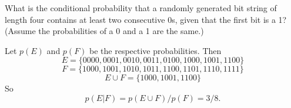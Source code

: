 \documentclass[../main.tex]{subfiles}
\begin{document}
What is the conditional probability that a randomly generated bit string of length four contains at least two consecutive 0s, given that the first bit is a 1?
(Assume the probabilities of a 0 and a 1 are the same.)

\solution
Let $p(E)$ and $p(F)$ be the respective probabilities.
Then
\[
	E = \{0000, 0001, 0010, 0011, 0100, 1000, 1001, 1100\}
\]
\[
	F = \{1000, 1001, 1010, 1011, 1100, 1101, 1110, 1111\}
\]
\[
	E \cup F = \{1000, 1001, 1100\}
\]
So
\[
p(E|F) = p(E \cup F)/p(F) = 3/8.
\]
\end{document}
